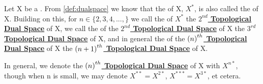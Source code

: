 \label{def:higherorderdualspaces}
\newcommand{\SecondTopDualSpace}[0]{\textbf{\hyperref[def:higherorderdualspaces]{\ensuremath{2^{nd}} Topological Dual Space}}\xspace}
\newcommand{\ThirdTopDualSpace}[0]{\textbf{\hyperref[def:higherorderdualspaces]{\ensuremath{3^{rd}} Topological Dual Space}}\xspace}
\newcommand{\NthTopDualSpace}[1]{\textbf{\hyperref[def:higherorderdualspaces]{\ensuremath{\pa{#1}^{th}} Topological Dual Space}}\xspace}
\begin{df}
    Let X be a 
   \SeminormedSpace. 
    From 
    \ref{def:dualspace}
    we know that the 
    \TopDualSpace
    of X, 
    $X^*$, 
    is also called the 
    \FirstTopDualSpace
    of X. 
    Building on this, 
    for $n \in \{2, 3, 4, ..., \}$
    we call the 
    \FirstTopDualSpace
    of $X^*$ the 
    \SecondTopDualSpace
    of X, 
    we call the 
    \FirstTopDualSpace
    of the 
    \SecondTopDualSpace
    of X the 
    \ThirdTopDualSpace
    of X, and 
    in general the 
    \FirstTopDualSpace
    of the 
    \NthTopDualSpace{n}
    of X
    the 
    \NthTopDualSpace{n+1}
    of X. 
   
    In general, we denote the 
    \NthTopDualSpace{n}
    of X with 
    $X^{n*}$, 
    though when n is small, 
    we may denote 
    $X^{**}=X^{2*}$, $X^{***}=X^{3*}$, 
    et cetera. 


\end{df}
